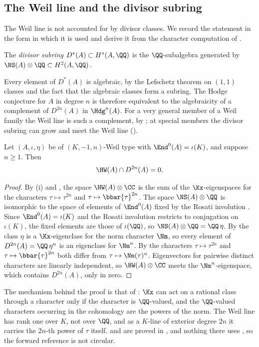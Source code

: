 \subsection{The Weil line and the divisor subring}

The Weil line is not accounted for by divisor classes. We record the
statement in the form in which it is used and derive it from the character
computation of .

\begin{definition}\label{def:divisorsubring}
The \emph{divisor subring} $D^{*}(A)\subset H^{*}(A,\QQ)$ is the
$\QQ$-subalgebra generated by $\NS(A)\otimes\QQ\subset H^{2}(A,\QQ)$.
\end{definition}

Every element of $D^{*}(A)$ is algebraic, by the Lefschetz theorem on $(1,1)$
classes and the fact that the algebraic classes form a subring. The Hodge
conjecture for $A$ in degree $n$ is therefore equivalent to the algebraicity
of a complement of $D^{2n}(A)$ in $\Hdg^{n}(A)$. For a very general member of
a Weil family the Weil line is such a complement, by ; at
special members the divisor subring can grow and meet the Weil line
(\cite[Remark~2.5]{paperIII}).

\begin{proposition}\label{prop:notpoly}
Let $(A,\iota,\eta)$ be of $(K,-1,n)$-Weil type with
$\End^{0}(A)=\iota(K)$, and suppose $n\ge1$. Then
\[
  \HW(A)\cap D^{2n}(A)=0 .
\]
\end{proposition}

\begin{proof}
By (i) and , the space
$\HW(A)\otimes\CC$ is the sum of the $\Kx$-eigenspaces for the characters
$\tau\mapsto\tau^{2n}$ and $\tau\mapsto\bbar{\tau}^{2n}$. The space
$\NS(A)\otimes\QQ$ is isomorphic to the space of elements of $\End^{0}(A)$
fixed by the Rosati involution \cite[Section~5.2]{BL04}. Since
$\End^{0}(A)=\iota(K)$ and the Rosati involution restricts to conjugation on
$\iota(K)$, the fixed elements are those of $\iota(\QQ)$, so
$\NS(A)\otimes\QQ=\QQ\,\eta$. By  the class $\eta$ is a
$\Kx$-eigenclass for the norm character $\Nm$, so every element of
$D^{2n}(A)=\QQ\,\eta^{n}$ is an eigenclass for $\Nm^{n}$. By
 the characters $\tau\mapsto\tau^{2n}$ and
$\tau\mapsto\bbar{\tau}^{2n}$ both differ from $\tau\mapsto\Nm(\tau)^{n}$.
Eigenvectors for pairwise distinct characters are linearly independent, so
$\HW(A)\otimes\CC$ meets the $\Nm^{n}$-eigenspace, which contains
$D^{2n}(A)$, only in zero.
\end{proof}

The mechanism behind the proof is that of : $\Kx$
can act on a rational class through a character only if the character is
$\QQ$-valued, and the $\QQ$-valued characters occurring in the cohomology
are the powers of the norm. The Weil line has rank one over $K$, not over $\QQ$, and as a
$K$-line of exterior degree $2n$ it carries the $2n$-th power of $\tau$
itself.  and  are proved
in , and nothing there uses , so the
forward reference is not circular.
